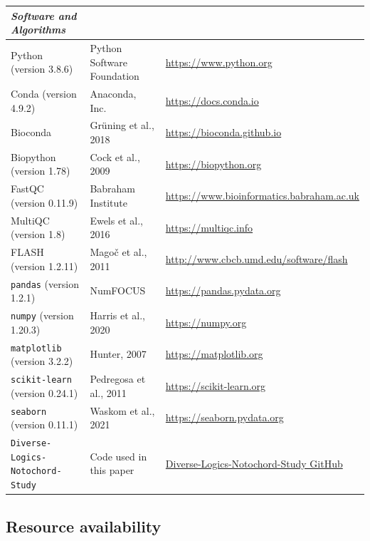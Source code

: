 \begin{landscape}
\begin{longtable}{p{} p{} p{}}
        \hline \textit{Software and Algorithms} \\ \hline
        Python (version 3.8.6)  & Python Software Foundation & \href{https://www.python.org}{https://www.python.org} \\
        Conda (version 4.9.2) & Anaconda, Inc. & \href{https://docs.conda.io/}{https://docs.conda.io} \\
        Bioconda  & Grüning et al., 2018 & \href{https://bioconda.github.io}{https://bioconda.github.io} \\
        Biopython (version 1.78) & Cock et al., 2009 & \href{https://biopython.org}{https://biopython.org} \\
        FastQC (version 0.11.9)	& Babraham Institute & \href{https://www.bioinformatics.babraham.ac.uk/}{https://www.bioinformatics.babraham.ac.uk} \\
        MultiQC (version 1.8) & Ewels et al., 2016 & \href{https://multiqc.info}{https://multiqc.info} \\
        FLASH (version 1.2.11) & Magoč et al., 2011 & \href{http://www.cbcb.umd.edu/software/flash}{http://www.cbcb.umd.edu/software/flash} \\
        \verb|pandas| (version 1.2.1) & NumFOCUS & \href{https://pandas.pydata.org}{https://pandas.pydata.org} \\
        \verb|numpy| (version 1.20.3) & Harris et al., 2020 & \href{https://numpy.org}{https://numpy.org} \\
        \verb|matplotlib| (version 3.2.2) & Hunter, 2007 & \href{https://matplotlib.org/}{https://matplotlib.org} \\
        \verb|scikit-learn| (version 0.24.1) & Pedregosa et al., 2011 & \href{https://scikit-learn.org/}{https://scikit-learn.org} \\
        \verb|seaborn| (version 0.11.1) & Waskom et al., 2021 & \href{https://seaborn.pydata.org/}{https://seaborn.pydata.org} \\
        \verb|Diverse-Logics-Notochord-Study| & Code used in this paper & \href{https://github.com/mragsac/Diverse-Logics-Notochord-Study}{Diverse-Logics-Notochord-Study GitHub} \\
    \end{longtable}
\end{landscape}

\subsection{Resource availability}

